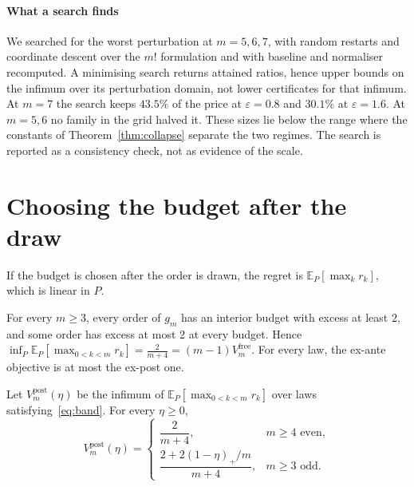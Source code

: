 \paragraph{What a search finds}
We searched for the worst perturbation at $m=5,6,7$, with random restarts and coordinate
descent over the $m!$ formulation and with baseline and normaliser recomputed. A minimising search returns
attained ratios, hence upper bounds on the infimum over its perturbation domain, not lower
certificates for that infimum. At $m=7$ the search keeps $43.5\%$
of the price at $\varepsilon=0.8$ and $30.1\%$ at $\varepsilon=1.6$. At $m=5,6$ no family in
the grid halved it. \NUM{} These sizes lie below the range where the constants of
Theorem~\ref{thm:collapse} separate the two regimes. The search is reported as a consistency
check, not as evidence of the scale.

\section{Choosing the budget after the draw}
\label{sec:expost}

If the budget is chosen after the order is drawn, the regret is
$\mathbb{E}_{P}[\max_{k}r_{k}]$, which is linear in $P$.

\begin{proposition}
\label{prop:expost}
For every $m\ge3$, every order of $g_{m}$ has an interior budget with excess at least $2$,
and some order has excess at most $2$ at every budget. Hence
$\inf_{P}\mathbb{E}_{P}[\max_{0<k<m}r_{k}]=\frac{2}{m+4}=(m-1)V^{\mathrm{free}}_{m}$. For
every law, the ex-ante objective is at most the ex-post one.
\end{proposition}


\begin{theorem}
\label{thm:expostband}
Let $V^{\mathrm{post}}_{m}(\eta)$ be the infimum of $\mathbb{E}_{P}[\max_{0<k<m}r_{k}]$ over laws
satisfying~\eqref{eq:band}. For every $\eta\ge0$,
\[
V^{\mathrm{post}}_{m}(\eta)=
\begin{cases}
\dfrac{2}{m+4}, & m\ge4\text{ even},\\[8pt]
\dfrac{2+2(1-\eta)_{+}/m}{m+4}, & m\ge3\text{ odd}.
\end{cases}
\]
\end{theorem}

